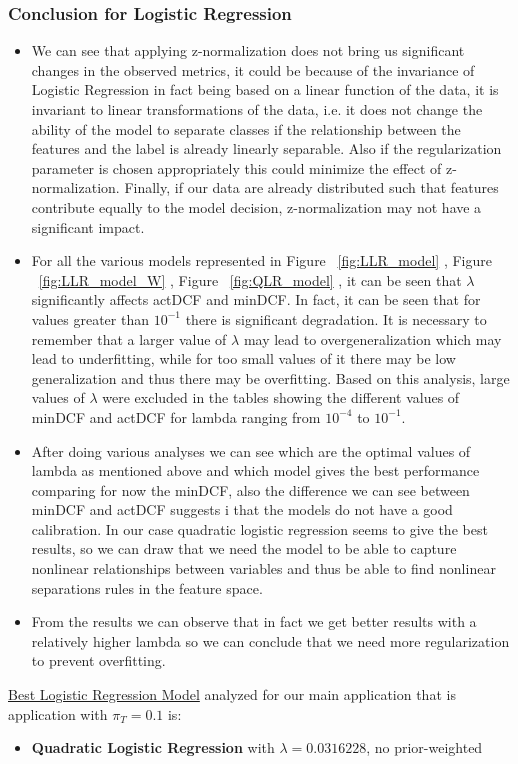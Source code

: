 \documentclass{article}
\begin{document}
\subsubsection*{Conclusion for Logistic Regression}
\begin{itemize}
    \item We can see that applying z-normalization does not bring us significant changes in the observed metrics, it could be because of the invariance of Logistic Regression in fact being based on a linear function of the data, it is invariant to linear transformations of the data, i.e. it does not change the ability of the model to separate classes if the relationship between the features and the label is already linearly separable.  Also if the regularization parameter is chosen appropriately this could minimize the effect of z-normalization. Finally, if our data are already distributed such that features contribute equally to the model decision, z-normalization may not have a significant impact.  
    \item For all the various models represented in
    Figure ~\ref{fig:LLR_model} ,
    Figure ~\ref{fig:LLR_model_W} ,
    Figure ~\ref{fig:QLR_model} ,
    it can be seen that \(\lambda\) significantly affects actDCF and minDCF. In fact, it can be seen that for values greater than \(10^{-1}\) there is significant degradation. It is necessary to remember that a larger value of \(\lambda\) may lead to overgeneralization which may lead to underfitting, while for too small values of it there may be low generalization and thus there may be overfitting. Based on this analysis, large values of \(\lambda\) were excluded in the tables showing the different values of minDCF and actDCF for lambda ranging from \(10^{-4}\) to \(10^{-1}\).
\item After doing various analyses we can see which are the optimal values of lambda as mentioned above 
and which model gives the best performance comparing for now the minDCF, also the difference we can see between minDCF and actDCF suggests i that the models do not have a good calibration.
In our case quadratic logistic regression seems to give the best results, so we can draw that we need the model to be able to capture nonlinear relationships between variables and thus be able to find nonlinear separations rules in the feature space.
\item From the results we can observe that in fact we get better results with a relatively higher lambda so we can conclude that we need more regularization to prevent overfitting.
\end{itemize}
\underline{Best Logistic Regression Model} analyzed for our main application that is application with \(\pi_T=0.1\) is:
\begin{itemize}
    \item \textbf{Quadratic Logistic Regression} with \(\lambda=0.0316228\), no prior-weighted
\end{itemize}
\end{document}
